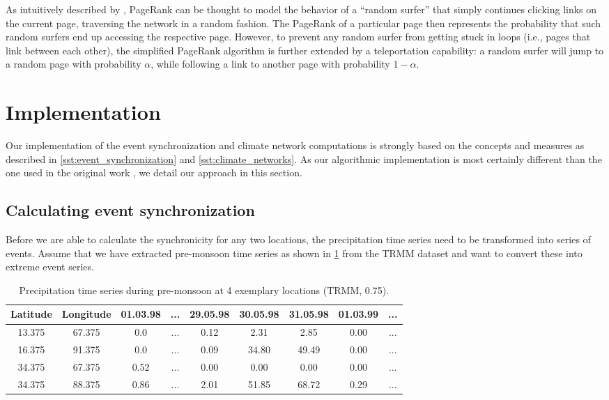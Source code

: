 As intuitively described by \citet{Page.1999}, PageRank can be thought to model the behavior of a ``random surfer'' that simply continues clicking links on the current page, traversing the network in a random fashion. The PageRank of a particular page then represents the probability that such random surfers end up accessing the respective page. However, to prevent any random surfer from getting stuck in loops (i.e., pages that link between each other), the simplified PageRank algorithm is further extended by a teleportation capability: a random surfer will jump to a random page with probability $\alpha$, while following a link to another page with probability $1-\alpha$.


\clearpage
\section{Implementation}
\label{st:event_sync_implementation}
Our implementation of the event synchronization and climate network computations is strongly based on the concepts and measures as described in \cref{sst:event_synchronization} and \cref{sst:climate_networks}. As our algorithmic implementation is most certainly different than the one used in the original work \citep{Stolbova.2015}, we detail our approach in this section.

\subsection{Calculating event synchronization}
\label{sst:event_sync_calculation}
Before we are able to calculate the synchronicity for any two locations, the precipitation time series need to be transformed into series of events. Assume that we have extracted pre-monsoon time series as shown in \cref{tab:example_rainfall_ts} from the TRMM dataset and want to convert these into extreme event series.

\begin{table}[h]
  \centering
  \begin{tabular}{ |c|c|ccccccc| }
    \hline
    Latitude & Longitude & 01.03.98 & ... & 29.05.98 & 30.05.98 & 31.05.98 & 01.03.99 & ...\\
    \hline
    13.375 & 67.375 & 0.0  & ... & 0.12 & 2.31  & 2.85  & 0.00 & ... \\
    16.375 & 91.375 & 0.0  & ... & 0.09 & 34.80 & 49.49 & 0.00 & ... \\
    34.375 & 67.375 & 0.52 & ... & 0.00 & 0.00  & 0.00  & 0.00 & ... \\
    34.375 & 88.375 & 0.86 & ... & 2.01 & 51.85 & 68.72 & 0.29 & ... \\
    \hline
  \end{tabular}
  \caption{Precipitation time series during pre-monsoon at 4 exemplary locations (TRMM, 0.75\degree).}
  \label{tab:example_rainfall_ts}
\end{table}

